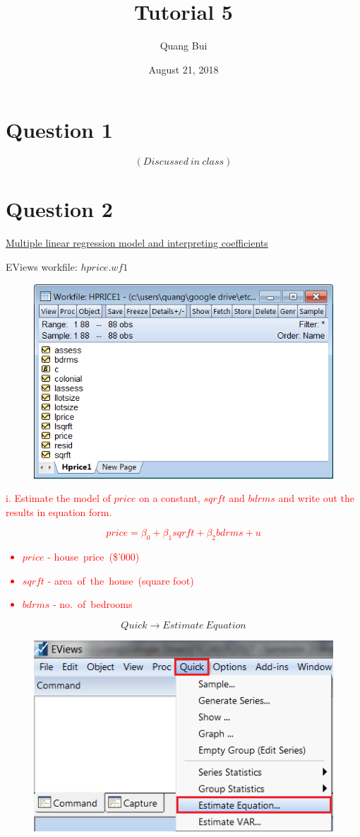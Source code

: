 \documentclass[12pt]{report}
\title{Tutorial 5}
\subtitle
{
	\textbf{keywords}: estimators, unbiasedness, expected value, variance, multiple linear regression, interpretation, ceteris paribus, prediction, interpretation, R squared
	
	\textbf{estimated reading time}: 30 minutes
}
\author{Quang Bui}
\date{August 21, 2018}
\begin{document}
	
\maketitle

\newpage
\section*{Question 1}
$$(Discussed\ in\ class)$$

\newpage
\section*{Question 2}
\underline{Multiple linear regression model and interpreting coefficients}

\noindent EViews workfile: $hprice.wf1$
\begin{figure}[H]
	\centering
	\includegraphics{q5_1}
\end{figure}
\vspace{-\baselineskip}
\noindent \textcolor{red}
{
	i. Estimate the model of $price$ on a constant, $sqrft$ and $bdrms$ and write out the results in equation form.
}
\noindent \textcolor{red}{$$price = \beta_0 + \beta_1sqrft + \beta_2bdrms + u$$ \begin{itemize}
		\item $price$ - house\ price\ (\$'000)
		\item $sqrft$ - area\ of\ the\ house\ (square foot)
		\item $bdrms$ - no.\ of\ bedrooms
\end{itemize}} \vspace{-\baselineskip}
$$Quick \to Estimate\ Equation$$
\begin{figure}[H]
	\centering
	\includegraphics{q1_2}
\end{figure}
\end{document}
